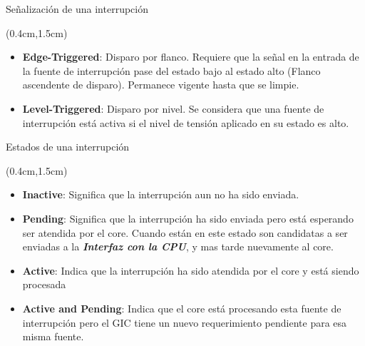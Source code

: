 \documentclass[usenames,table,xcolor={x11names},aspectratio=169]{beamer}
\begin{document}
\begin{frame}[t]{Señalización de una interrupción}
 \begin{textblock*}{\textwidth}(0.4cm,1.5cm)
  \begin{itemize}[<+(1)->]\justifying \parskip 0.4cm
   \item \textbf{\color{Blue1}Edge-Triggered}: Disparo por flanco. Requiere que la señal en la entrada de la fuente de interrupción pase del estado bajo al estado alto (Flanco ascendente de disparo). Permanece vigente hasta que se limpie.
   \item \textbf{\color{Blue3}Level-Triggered}: Disparo por nivel. Se considera que una fuente de interrupción está activa si el nivel de tensión aplicado en su estado es alto.
  \end{itemize}
 \end{textblock*}
\end{frame}

\begin{frame}[t]{Estados de una interrupción}
 \begin{textblock*}{\textwidth}(0.4cm,1.5cm)
  \begin{itemize}[<+(1)->]\justifying \parskip 0.4cm
   \item \textbf{\color{Blue1}Inactive}: Significa que la interrupción aun no ha sido enviada.
   \item \textbf{\color{Blue2}Pending}: Significa que la interrupción ha sido enviada pero está esperando ser atendida por el core. Cuando están en este estado son candidatas a ser enviadas a la \textit{\textbf{Interfaz con la CPU}}, y mas tarde nuevamente al core.
   \item \textbf{\color{Blue3}Active}: Indica que la interrupción ha sido atendida por el core y está siendo procesada
   \item \textbf{\color{Blue4}Active and Pending}: Indica que el core está procesando esta fuente de interrupción pero el GIC tiene un nuevo requerimiento pendiente para esa misma fuente.
  \end{itemize}   
 \end{textblock*}
\end{frame}
\end{document}

